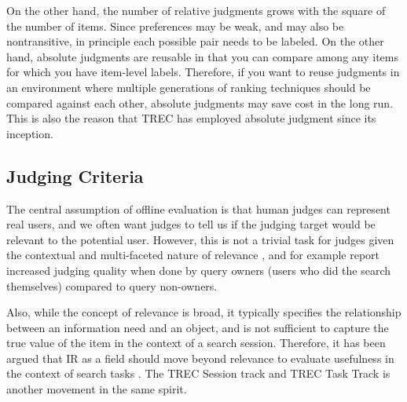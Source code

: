 On the other hand, the number of relative judgments grows with the square of the number of items. Since preferences may be weak, and may also be nontransitive, in principle each possible pair needs to be labeled. \cite{CarteretteBCD08} On the other hand, absolute judgments are reusable in that you can compare among any items for which you have item-level labels. Therefore, if you want to reuse judgments in an environment where multiple generations of ranking techniques should be compared against each other, absolute judgments may save cost in the long run. This is also the reason that TREC has employed absolute judgment since its inception.\cite{}



\subsection{Judging Criteria}
The central assumption of offline evaluation is that human judges can represent real users, and we often want judges to tell us if the judging target would be relevant to the potential user.  However, this is not a trivial task for judges given the contextual and multi-faceted nature of relevance \citep{Borlund:2003}, and for example \cite{Chouldechova:2013} report increased judging quality when done by query owners (users who did the search themselves) compared to query non-owners.

Also, while the concept of relevance is broad, it typically specifies the relationship between an information need and an object, and is not sufficient to capture the true value of the item in the context of a search session. Therefore, it has been argued that IR as a field should move beyond relevance to evaluate usefulness in the context of search tasks \citep{Belkin:2015:SAL}. The TREC Session track \citep{carterette2014overview} and TREC Task Track \cite{yilmaz2015overview} is another movement in the same spirit.


